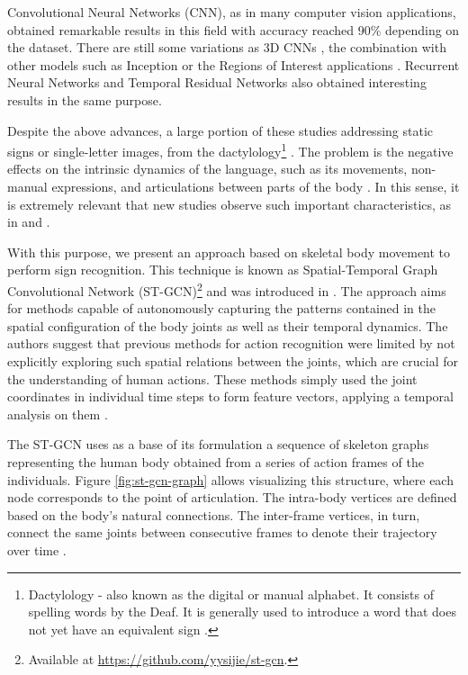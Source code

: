 Convolutional Neural Networks (CNN), as in many computer vision applications, obtained remarkable results in this field with accuracy reached 90\% \cite{shanta-2018, ji-2017, taskiran-2018, rao-2018} depending on the dataset. There are still some variations as 3D CNNs \cite{elbadawy-2017}, the combination with other models such as Inception \cite{das-2018} or the Regions of Interest applications \cite{sajanraj-2018}. Recurrent Neural Networks \cite{konstantinidis-2018} and Temporal Residual Networks \cite{pigou-2017} also obtained interesting results in the same purpose.

Despite the above advances, a large portion of these studies addressing static signs or single-letter images, from the dactylology\footnote{Dactylology - also known as the digital or manual alphabet. It consists of spelling words by the Deaf. It is generally used to introduce a word that does not yet have an equivalent sign \cite{quadros-2004, pereira-choi-2011}.
} \cite{shanta-2018, taskiran-2018, elbadawy-2017, das-2018, sajanraj-2018}. The problem is the negative effects on the intrinsic dynamics of the language, such as its movements, non-manual expressions, and articulations between parts of the body \cite{quadros-2004}. In this sense, it is extremely relevant that new studies observe such important characteristics, as in \cite{konstantinidis-2018} and \cite {pigou-2017}.

With this purpose, we present an approach based on skeletal body movement to perform sign recognition. This technique is known as Spatial-Temporal Graph Convolutional Network (ST-GCN)\footnote {Available at \url{https://github.com/yysijie/st-gcn}.} and was introduced in \cite{st-gcn-2018}. The approach aims for methods capable of autonomously capturing the patterns contained in the spatial configuration of the body joints as well as their temporal dynamics. The authors suggest that previous methods for action recognition were limited by not explicitly exploring such spatial relations between the joints, which are crucial for the understanding of human actions. These methods simply used the joint coordinates in individual time steps to form feature vectors, applying a temporal analysis on them \cite{st-gcn-2018, wang-2012, fernando-2015}.

The ST-GCN uses as a base of its formulation a sequence of skeleton graphs representing the human body obtained from a series of action frames of the individuals. Figure \ref{fig:st-gcn-graph} allows visualizing this structure, where each node corresponds to the point of articulation. The intra-body vertices are defined based on the body's natural connections. The inter-frame vertices, in turn, connect the same joints between consecutive frames to denote their trajectory over time \cite{st-gcn-2018}.
    
